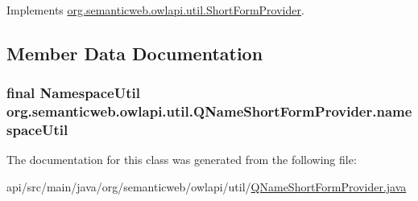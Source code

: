 Implements \hyperlink{interfaceorg_1_1semanticweb_1_1owlapi_1_1util_1_1_short_form_provider_aca40ef0eda3bf146115c473088cc305d}{org.\-semanticweb.\-owlapi.\-util.\-Short\-Form\-Provider}.



\subsection{Member Data Documentation}
\hypertarget{classorg_1_1semanticweb_1_1owlapi_1_1util_1_1_q_name_short_form_provider_ad565b22015f009b9d64631c69f014ee9}{
\subsubsection[{namespace\-Util}]{\setlength{\rightskip}{0pt plus 5cm}final {\bf Namespace\-Util} org.\-semanticweb.\-owlapi.\-util.\-Q\-Name\-Short\-Form\-Provider.\-namespace\-Util\hspace{0.3cm}{\ttfamily [private]}}}\label{classorg_1_1semanticweb_1_1owlapi_1_1util_1_1_q_name_short_form_provider_ad565b22015f009b9d64631c69f014ee9}


The documentation for this class was generated from the following file\-:\begin{DoxyCompactItemize}
\item 
api/src/main/java/org/semanticweb/owlapi/util/\hyperlink{_q_name_short_form_provider_8java}{Q\-Name\-Short\-Form\-Provider.\-java}\end{DoxyCompactItemize}
